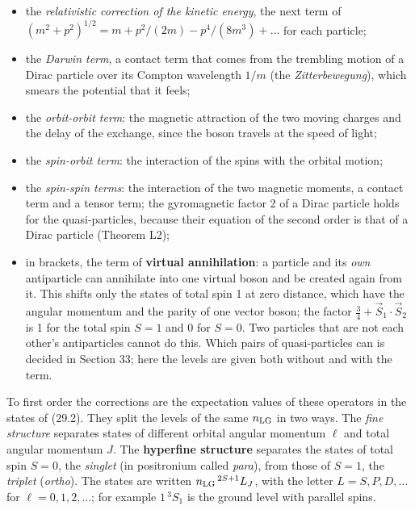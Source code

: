 \documentclass[
  10pt,
]{article}
\providecommand{\tightlist}{%
  \setlength{\itemsep}{0pt}\setlength{\parskip}{0pt}}
\begin{document}
\begin{itemize}
\tightlist
\item
  the \emph{relativistic correction of the kinetic energy}, the next
  term of \((m^2+p^2)^{1/2}=m+p^2/(2m)-p^4/(8m^3)+\dots\) for each
  particle;
\item
  the \emph{Darwin term}, a contact term that comes from the trembling
  motion of a Dirac particle over its Compton wavelength \(1/m\) (the
  \emph{Zitterbewegung}), which smears the potential that it feels;
\item
  the \emph{orbit-orbit term}: the magnetic attraction of the two moving
  charges and the delay of the exchange, since the boson travels at the
  speed of light;
\item
  the \emph{spin-orbit term}: the interaction of the spins with the
  orbital motion;
\item
  the \emph{spin-spin terms}: the interaction of the two magnetic
  moments, a contact term and a tensor term; the gyromagnetic factor 2
  of a Dirac particle holds for the quasi-particles, because their
  equation of the second order is that of a Dirac particle (Theorem L2);
\item
  in brackets, the term of \textbf{virtual annihilation}: a particle and
  its \emph{own} antiparticle can annihilate into one virtual boson and
  be created again from it. This shifts only the states of total spin 1
  at zero distance, which have the angular momentum and the parity of
  one vector boson; the factor \(\tfrac34+\vec S_1\cdot\vec S_2\) is 1
  for the total spin \(S=1\) and 0 for \(S=0\). Two particles that are
  not each other's antiparticles cannot do this. Which pairs of
  quasi-particles can is decided in Section 33; here the levels are
  given both without and with the term.
\end{itemize}

To first order the corrections are the expectation values of these
operators in the states of (29.2). They split the levels of the same
\(n_{\rm LG}\) in two ways. The \emph{fine structure} separates states
of different orbital angular momentum \(\ell\) and total angular
momentum \(J\). The \textbf{hyperfine structure} separates the states of
total spin \(S=0\), the \emph{singlet} (in positronium called
\emph{para}), from those of \(S=1\), the \emph{triplet} (\emph{ortho}).
The states are written \(n_{\rm LG}\,{}^{2S+1}L_J\), with the letter
\(L=S,P,D,\dots\) for \(\ell=0,1,2,\dots\); for example \(1\,{}^3S_1\)
is the ground level with parallel spins.
\end{document}
